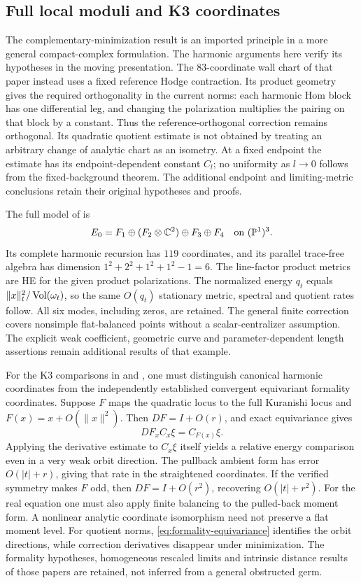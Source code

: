 \subsection{Full local moduli and K3 coordinates}
The complementary-minimization result
\cite[Section~8]{wuebben6} is an imported principle in a more
general compact-complex formulation. The harmonic arguments here
verify its hypotheses in the moving presentation. The
$83$-coordinate wall chart of that paper instead uses a fixed
reference Hodge contraction. Its product geometry gives the
required orthogonality in the current norms: each harmonic Hom
block has one differential leg, and changing the polarization
multiplies the pairing on that block by a constant.
Thus the reference-orthogonal correction remains orthogonal.
Its quadratic quotient estimate is not obtained by treating an
arbitrary change of analytic chart as an isometry.
At a fixed endpoint the estimate has its endpoint-dependent
constant $C_l$; no uniformity as $l\to0$ follows from the
fixed-background theorem. The additional endpoint and limiting-metric
conclusions retain their original hypotheses and proofs.

The full model of \cite[Sections~2, 4--6]{wuebben7} is
\[
 E_0=F_1\oplus(F_2\otimes\mathbb C^2)\oplus F_3\oplus F_4
                    \quad\hbox{on }(\mathbb P^1)^3 .
\]
Its complete harmonic recursion has $119$ coordinates, and its
parallel trace-free algebra has dimension
$1^2+2^2+1^2+1^2-1=6$. The line-factor product metrics are HE for
the given product polarizations. The normalized energy $q_t$
equals $\|x\|_t^2/\operatorname{Vol}(\omega_t)$, so the same $O(q_t)$
stationary metric, spectral and quotient rates follow.
All six modes, including zeros, are retained.
The general finite correction covers nonsimple flat-balanced
points without a scalar-centralizer assumption.
The explicit weak coefficient, geometric curve and
parameter-dependent length assertions remain additional results
of that example.

For the K3 comparisons in
\cite[Sections~4, 6]{wuebben13} and
\cite[Section~3]{wuebben14}, one must distinguish canonical
harmonic coordinates from the independently established
convergent equivariant formality coordinates. Suppose $F$ maps
the quadratic locus to the full Kuranishi locus and
$F(x)=x+O(\|x\|^2)$. Then $DF=I+O(r)$, and exact equivariance gives
\begin{equation}\label{eq:formality-equivariance}
 DF_xC_x\xi=C_{F(x)}\xi.
\end{equation}
Applying the derivative estimate to $C_x\xi$ itself yields a
relative energy comparison even in a very weak orbit direction.
The pullback ambient form has error $O(|t|+r)$, giving that
rate in the straightened coordinates. If the verified symmetry
makes $F$ odd, then $DF=I+O(r^2)$, recovering $O(|t|+r^2)$.
For the real equation one must also apply finite balancing to
the pulled-back moment form. A nonlinear analytic coordinate
isomorphism need not preserve a flat moment level.
For quotient norms, \eqref{eq:formality-equivariance} identifies
the orbit directions, while correction derivatives disappear
under minimization. The formality hypotheses, homogeneous
rescaled limits and intrinsic distance results of those papers
are retained, not inferred from a general obstructed germ.

